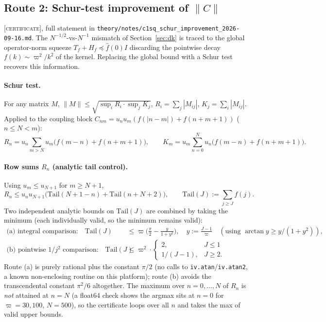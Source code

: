 \documentclass[11pt]{article}
\begin{document}
\subsection{Route 2: Schur-test improvement of $\|C\|$}\label{sec:schur}

\textsc{[certificate]}, full statement in
\texttt{theory/notes/c1sq\_schur\_improvement\_2026-09-16.md}. The
$N^{-1/2}$-vs-$N^{-1}$ mismatch of Section~\ref{sec:dk} is traced to the
global operator-norm squeeze $T_f+H_f\preceq\hat f(0)I$ discarding the
pointwise decay $f(k)\sim\varpi^2/k^2$ of the kernel. Replacing the global
bound with a Schur test recovers this information.

\paragraph{Schur test.} For any matrix $M$,
$\|M\|\le\sqrt{\sup_i R_i\cdot\sup_j K_j}$, $R_i=\sum_j|M_{ij}|$,
$K_j=\sum_i|M_{ij}|$. Applied to the coupling block $C_{nm}=u_nu_m(f(|n-m|)+f(n+m+1))$
($n\le N<m$):
\[
 R_n=u_n\sum_{m>N}u_m\big(f(m-n)+f(n+m+1)\big),\qquad
 K_m=u_m\sum_{n=0}^N u_n\big(f(m-n)+f(n+m+1)\big).
\]

\paragraph{Row sums $R_n$ (analytic tail control).} Using $u_m\le u_{N+1}$
for $m\ge N+1$,
\[
 R_n\le u_nu_{N+1}\big(\mathrm{Tail}(N{+}1{-}n)+\mathrm{Tail}(n{+}N{+}2)\big),
 \qquad \mathrm{Tail}(J):=\sum_{j\ge J}f(j).
\]
Two independent analytic bounds on $\mathrm{Tail}(J)$ are combined by taking
the minimum (each individually valid, so the minimum remains valid):
\begin{align}
\text{(a) integral comparison:}\quad
 \mathrm{Tail}(J) &\le \varpi\Big(\frac\pi2-\frac{y}{1+y^2}\Big),\quad y:=\frac{J-1}\varpi
 \quad(\text{using }\arctan y\ge y/(1+y^2)),\\
\text{(b) pointwise }1/j^2\text{ comparison:}\quad
 \mathrm{Tail}(J) &\le \varpi^2\cdot\begin{cases}2,& J\le1\\ 1/(J-1),&J\ge2.\end{cases}
\end{align}
Route (a) is purely rational plus the constant $\pi/2$ (no calls to
\texttt{iv.atan}/\texttt{iv.atan2}, a known non-enclosing routine on this
platform); route (b) avoids the transcendental constant $\pi^2/6$ altogether.
The maximum over $n=0,\dots,N$ of $R_n$ is \emph{not} attained at $n=N$ (a
float64 check shows the argmax sits at $n=0$ for $\varpi=30,100$, $N=500$),
so the certificate loops over all $n$ and takes the max of valid upper
bounds.
\end{document}
